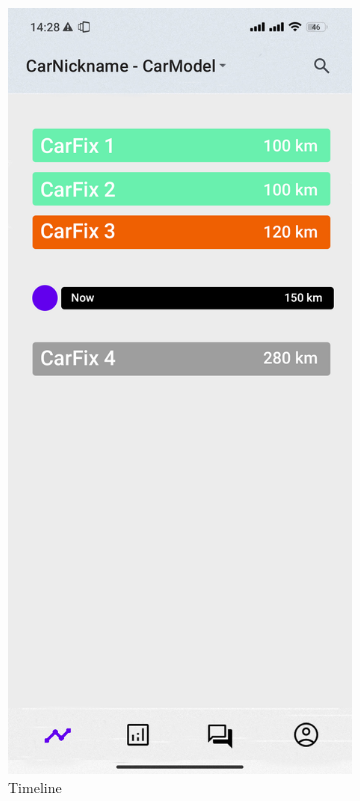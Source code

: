\documentclass[11pt]{scrartcl} %
\begin{document}
\begin{figure}[!htb]
\begin{subfigure}{.5\textwidth}
  \centering
  \includegraphics[width=.6\linewidth]{assets/timeline_mock_up.jpg}
  \caption{Timeline}
  \label{fig:sfig1}
\end{subfigure}%
\begin{subfigure}{.5\textwidth}
  \centering

\end{subfigure}
\end{figure}
\end{document}
